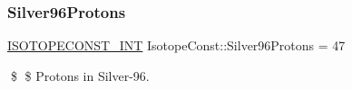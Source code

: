 \subsubsection{\texorpdfstring{Silver96\+Protons}{Silver96Protons}}
{\footnotesize\ttfamily \mbox{\hyperlink{group___isotope_const-_macros_ga5f18360b3e99483a35c32d789e62621c}{I\+S\+O\+T\+O\+P\+E\+C\+O\+N\+S\+T\+\_\+\+I\+NT}} Isotope\+Const\+::\+Silver96\+Protons = 47}

\$ \$ Protons in Silver-\/96. 